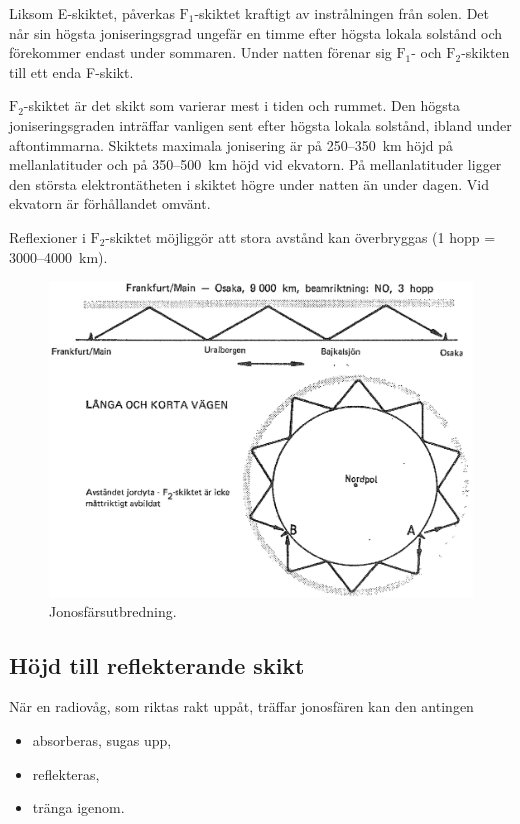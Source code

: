 Liksom E-skiktet, påverkas \(\mathrm{F_1}\)-skiktet kraftigt av
instrålningen från solen. Det når sin högsta joniseringsgrad ungefär
en timme efter högsta lokala solstånd och förekommer endast under
sommaren. Under natten förenar sig \(\mathrm{F_1}\)- och
\(\mathrm{F_2}\)-skikten till ett enda F-skikt.

\(\mathrm{F_2}\)-skiktet är det skikt som varierar mest i tiden och rummet.
Den högsta joniseringsgraden inträffar vanligen sent efter högsta lokala
solstånd, ibland under aftontimmarna.
Skiktets maximala jonisering är på 250--350~km höjd på mellanlatituder och på
350--500~km höjd vid ekvatorn.
På mellanlatituder ligger den största elektrontätheten i skiktet högre under
natten än under dagen.
Vid ekvatorn är förhållandet omvänt.

Reflexioner i \(\mathrm{F_2}\)-skiktet möjliggör att stora
avstånd kan överbryggas (1 hopp = 3000--4000~km).

\begin{figure}
  \includegraphics[width=\textwidth]{images/cropped_pdfs/bild_2_7-08.pdf}
  \caption{Jonosfärsutbredning.}
  \label{fig:bildII7-8}
\end{figure}

\subsection{Höjd till reflekterande skikt}

När en radiovåg, som riktas rakt uppåt, träffar jonosfären kan den antingen
\begin{itemize}
\item absorberas, sugas upp,
\item reflekteras,
\item tränga igenom.
\end{itemize}

